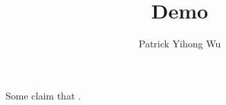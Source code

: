 \documentclass{article}
\title{Demo}
\author{Patrick Yihong Wu}
\begin{document}
\maketitle

Some claim that \cite{sanchez2017comparison}.



\end{document}
